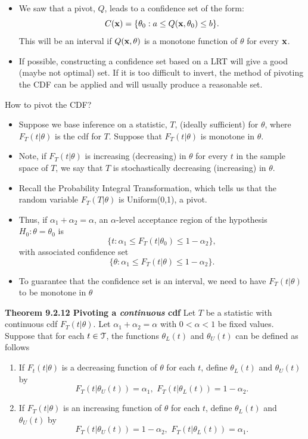 \documentclass[11pt,]{article}
\def\bx{{\bf x}}
\def\Tsc{{\cal T}}
\begin{document}
\begin{itemize}
\item We saw that a pivot, $Q$, leads to a confidence set of the form:
$$C(\bx) = \{ \theta_0: a \leq Q(\bx, \theta_0) \leq b\}.$$
This will be an interval if $Q(\bx, \theta)$ is a monotone function of $\theta$ for every $\bx$.
\item If possible, constructing a confidence set based on a LRT will give a good (maybe not optimal) set. If it is too difficult to invert, the method of pivoting the CDF can be applied and will usually produce a reasonable set.
\end{itemize}

How to pivot the CDF?

\begin{itemize}
\item Suppose we base inference on a statistic, $T$, (ideally sufficient) for $\theta$, where $F_T(t|\theta)$ is the cdf for $T$. Suppose that $F_T(t|\theta)$ is monotone in $\theta$.
\item Note, if $F_T(t|\theta)$ is increasing (decreasing) in $\theta$ for every $t$ in the sample space of $T$, we say that $T$ is stochastically decreasing (increasing) in $\theta$.
\item Recall the Probability Integral Transformation, which tells us that the random variable $F_T(T|\theta)$ is Uniform(0,1), a pivot.
\item Thus, if $\alpha_1 + \alpha_2 = \alpha$, an $\alpha$-level acceptance region of the hypothesis $H_0: \theta = \theta_0$ is
$$\{t: \alpha_1 \leq F_T(t|\theta_0) \leq 1 - \alpha_2\},$$
with associated confidence set
$$\{ \theta: \alpha_1 \leq F_T(t|\theta) \leq 1 - \alpha_2\}.$$
\item To guarantee that the confidence set is an interval, we need to have $F_T(t|\theta)$ to be monotone in $\theta$
\end{itemize}

\noindent\textbf{Theorem 9.2.12 Pivoting a {\em continuous} cdf} Let
\(T\) be a statistic with continuous cdf \(F_T(t|\theta)\). Let
\(\alpha_1 + \alpha_2 = \alpha\) with \(0< \alpha < 1\) be fixed values.
Suppose that for each \(t \in \Tsc\), the functions \(\theta_{L}(t)\)
and \(\theta_{U}(t)\) can be defined as follows

\begin{enumerate}
\def\labelenumi{\roman{enumi}.}
\item
  If \(F_t(t|\theta)\) is a decreasing function of \(\theta\) for each
  \(t\), define \(\theta_{L}(t)\) and \(\theta_{U}(t)\) by
  \[F_T(t|\theta_{U}(t)) = \alpha_1, \,\, F_T(t|\theta_{L}(t))  = 1 - \alpha_2.\]
\item
  If \(F_T(t|\theta)\) is an increasing function of \(\theta\) for each
  \(t\), define \(\theta_{L}(t)\) and \(\theta_{U}(t)\) by
  \[F_T(t|\theta_{U}(t)) = 1-\alpha_2, \, \, F_T(t|\theta_{L}(t))  = \alpha_1.\]
\end{enumerate}
\end{document}
